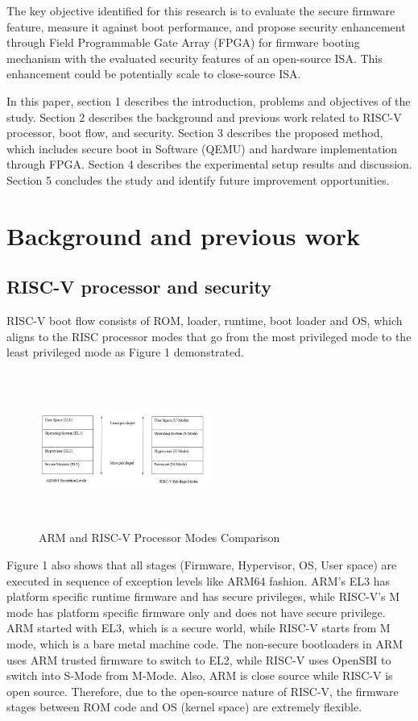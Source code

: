 \documentclass[a4paper,fleqn]{cas-dc}
\begin{document}
The key objective identified for this research is to
evaluate the secure firmware feature, measure it against boot performance, and propose
security enhancement through Field Programmable Gate Array (FPGA) for firmware booting
mechanism with the evaluated security features of an open-source ISA. This enhancement
could be potentially scale to close-source ISA.

In this paper, section 1 describes the introduction, problems and objectives of the study.
Section 2 describes the background and previous work related to RISC-V processor, boot flow, and
security. Section 3 describes the proposed method, which includes secure boot in Software (QEMU)
and hardware implementation through FPGA. Section 4 describes the experimental setup results and
discussion. Section 5 concludes the study and identify future improvement opportunities.

\section{ Background and previous work}

\subsection{ RISC-V processor and security}
RISC-V boot flow consists of ROM, loader, runtime, boot loader and OS, which aligns to the RISC processor modes that go from the most privileged mode to the least privileged mode as Figure 1 demonstrated. 

\begin{figure}[hbt!]
	\centering
	\includegraphics[width=0.5\textwidth,height=2in]{figs/ArmAndRiscVProcessorModesComparison.JPG}
	\caption{ARM and RISC-V Processor Modes Comparison}
\end{figure}

Figure 1 also shows that all stages (Firmware, Hypervisor, OS, User space) are executed in sequence of exception levels like ARM64 fashion. ARM’s EL3 has platform specific runtime firmware and has secure privileges, while RISC-V’s M mode has platform specific firmware only and does not have secure privilege. ARM started with EL3, which is a secure world, while RISC-V starts from M mode, which is a bare metal machine code. The non-secure bootloaders in ARM uses ARM trusted firmware to switch to EL2, while RISC-V uses OpenSBI to switch into S-Mode from M-Mode. Also, ARM is close source while RISC-V is open source. Therefore, due to the open-source nature of RISC-V, the firmware stages between ROM code and OS (kernel space) are extremely flexible.
\end{document}
